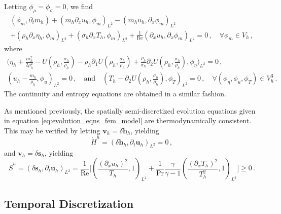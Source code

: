 Letting $\phi_\rho = \phi_\sigma = 0$, we find
\begin{multline}
    (\phi_m, \partial_t m_h)
    + \left( m_h \partial_x u_h, \phi_m \right)_{L^2}
    -
    \left( m_h u_h, \partial_x \phi_m \right)_{L^2} \\
    +
    \left( \rho_h \partial_x \eta_h, \phi_m \right)_{L^2}
    +
    \left( \sigma_h \partial_x T_h, \phi_m \right)_{L^2}
    +
    \frac{1}{\text{Re}}
    \left(\partial_x u_h, \partial_x \phi_m \right)_{L^2}
    =
    0 \,, \quad \forall \phi_m \in V_h \,,
\end{multline}
where
\begin{multline}
    \bigg(
    \eta_h
    + \frac{m_h^2}{2 \rho_h^2}
    - U \left(\rho_h, \frac{\sigma_h}{\rho_h} \right)
    - \rho_h \partial_1 U \left(\rho_h, \frac{\sigma_h}{\rho_h} \right)
    + \frac{\rho_h}{\sigma_h} \partial_2 U  \left(\rho_h, \frac{\sigma_h}{\rho_h} \right) ,
    \phi_\eta
    \bigg)_{L^2} = 0 \,, \\
    \left(u_h - \frac{m_h}{\rho_h}, \phi_u \right)_{L^2} = 0 \,,
    \quad \text{and} \quad
    \left(T_h - \partial_2 U  \left(\rho_h, \frac{\sigma_h}{\rho_h} \right), \phi_T \right)_{L^2} = 0 \,, \quad \forall (\phi_\eta, \phi_u, \phi_T) \in V_h^3 \,.
\end{multline}
The continuity and entropy equations are obtained in a similar fashion.

As mentioned previously, the spatially semi-discretized evolution equations given in equation \eqref{eq:evolution_eqns_fem_model} are thermodynamically consistent. This may be verified by letting $\bm{v}_h = \delta \bm{h}_h$, yielding
\begin{equation}
    \dot{H}^h
    =
    (\delta \bm{h}_h, \partial_t \bm{u}_h)_{L^2}
    =
    0 \,,
\end{equation}
and $\bm{v}_h = \delta \bm{s}_h$, yielding
\begin{equation}
    \dot{S}^h
    =
    (\delta \bm{s}_h, \partial_t \bm{u}_h)_{L^2}
    =
    \frac{1}{\text{Re}}
    \Bigg[
    \left(
    \frac{ (\partial_x u_h)^2}{T_h}, 1
    \right)_{L^2}
    +
    \frac{1}{\text{Pr}} \frac{\gamma}{\gamma - 1}
    \left(
    \frac{ (\partial_x T_h)^2}{T_h^2}, 1
    \right)_{L^2}
    \Bigg] \geq 0 \,.
\end{equation}


\subsection{Temporal Discretization}

